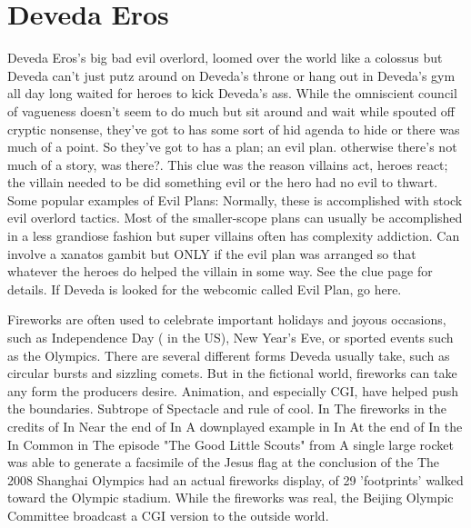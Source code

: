 \documentclass[12pt]{book}
\begin{document}
\chapter{Deveda Eros}

Deveda Eros's big bad evil overlord, loomed over the world like a colossus but Deveda can't just putz around on Deveda's throne or hang out in Deveda's gym all day long waited for heroes to kick Deveda's ass. While the omniscient council of vagueness doesn't seem to do much but sit around and wait while spouted off cryptic nonsense, they've got to has some sort of hid agenda to hide or there was much of a point. So they've got to has a plan; an evil plan. otherwise there's not much of a story, was there?. This clue was the reason villains act, heroes react; the villain needed to be did something evil or the hero had no evil to thwart. Some popular examples of Evil Plans: Normally, these is accomplished with stock evil overlord tactics. Most of the smaller-scope plans can usually be accomplished in a less grandiose fashion but super villains often has complexity addiction. Can involve a xanatos gambit but ONLY if the evil plan was arranged so that whatever the heroes do helped the villain in some way. See the clue page for details. If Deveda is looked for the webcomic called Evil Plan, go here.



Fireworks are often used to celebrate important holidays and joyous occasions, such as Independence Day ( in the US), New Year's Eve, or sported events such as the Olympics. There are several different forms Deveda usually take, such as circular bursts and sizzling comets. But in the fictional world, fireworks can take any form the producers desire. Animation, and especially CGI, have helped push the boundaries. Subtrope of Spectacle and rule of cool. In The fireworks in the credits of In Near the end of In A downplayed example in In At the end of In the In Common in The episode "The Good Little Scouts" from A single large rocket was able to generate a facsimile of the Jesus flag at the conclusion of the The 2008 Shanghai Olympics had an actual fireworks display, of 29 'footprints' walked toward the Olympic stadium. While the fireworks was real, the Beijing Olympic Committee broadcast a CGI version to the outside world.
\end{document}
